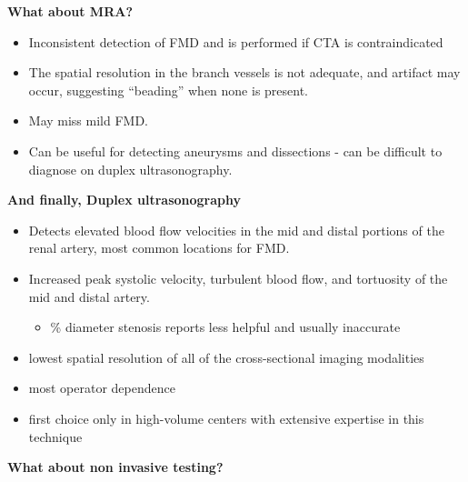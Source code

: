 \documentclass[
]{book}
\providecommand{\tightlist}{%
  \setlength{\itemsep}{0pt}\setlength{\parskip}{0pt}}
\begin{document}
\textbf{What about MRA?}

\begin{itemize}
\item
  Inconsistent detection of FMD and is performed if CTA is
  contraindicated
\item
  The spatial resolution in the branch vessels is not adequate, and
  artifact may occur, suggesting ``beading'' when none is present.
\item
  May miss mild FMD.
\item
  Can be useful for detecting aneurysms and dissections - can be
  difficult to diagnose on duplex ultrasonography.\citep{renaud2012}
\end{itemize}

\textbf{And finally, Duplex ultrasonography}

\begin{itemize}
\item
  Detects elevated blood flow velocities in the mid and distal
  portions of the renal artery, most common locations for FMD.
\item
  Increased peak systolic velocity, turbulent blood flow, and
  tortuosity of the mid and distal artery.

  \begin{itemize}
  \tightlist
  \item
    \% diameter stenosis reports less helpful and usually inaccurate
  \end{itemize}
\item
  lowest spatial resolution of all of the cross-sectional imaging
  modalities
\item
  most operator dependence
\item
  first choice only in high-volume centers with extensive expertise in
  this technique
\end{itemize}

\textbf{What about non invasive testing?}
\end{document}
